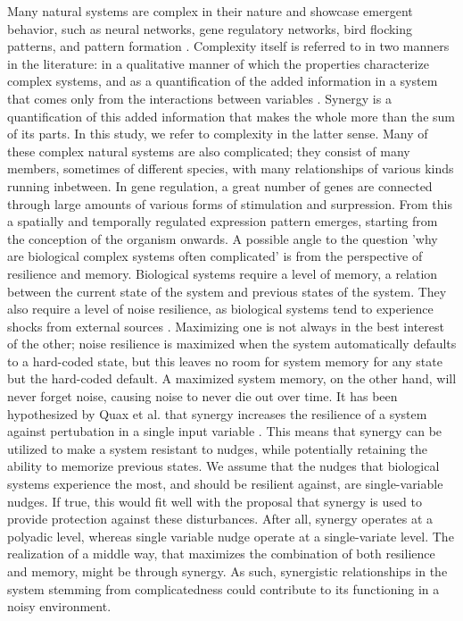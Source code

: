 \documentclass[../main.tex]{subfiles}
\begin{document}
Many natural systems are complex in their nature and showcase emergent behavior, such as neural networks, gene regulatory networks, bird flocking patterns, and pattern formation \cite{choi2001supply, gat1999synergy, kondo2010reaction, liang2008gene}.
Complexity itself is referred to in two manners in the literature: in a qualitative manner of which the properties characterize complex systems, and as a quantification of the added information in a system that comes only from the interactions between variables \cite{bar2004multiscale}.
Synergy is a quantification of this added information that makes the whole more than the sum of its parts.
In this study, we refer to complexity in the latter sense.
Many of these complex natural systems are also complicated; they consist of many members, sometimes of different species, with many relationships of various kinds running inbetween.
In gene regulation, a great number of genes are connected through large amounts of various forms of stimulation and surpression.
From this a spatially and temporally regulated expression pattern emerges, starting from the conception of the organism onwards.
A possible angle to the question 'why are biological complex systems often complicated' is from the perspective of resilience and memory.
Biological systems require a level of memory, a relation between the current state of the system and previous states of the system. 
They also require a level of noise resilience, as biological systems tend to experience shocks from external sources \cite{peixoto2012emergence}. %
Maximizing one is not always in the best interest of the other; noise resilience is maximized when the system automatically defaults to a hard-coded state, but this leaves no room for system memory for any state but the hard-coded default.
A maximized system memory, on the other hand, will never forget noise, causing noise to never die out over time.
It has been hypothesized by Quax et al. that synergy increases the resilience of a system against pertubation in a single input variable \cite{quax2017quantifying}.
This means that synergy can be utilized to make a system resistant to nudges, while potentially retaining the ability to memorize previous states.
We assume that the nudges that biological systems experience the most, and should be resilient against, are single-variable nudges.
If true, this would fit well with the proposal that synergy is used to provide protection against these disturbances.
After all, synergy operates at a polyadic level, whereas single variable nudge operate at a single-variate level.
The realization of a middle way, that maximizes the combination of both resilience and memory, might be through synergy.
As such, synergistic relationships in the system stemming from complicatedness could contribute to its functioning in a noisy environment.
\end{document}

